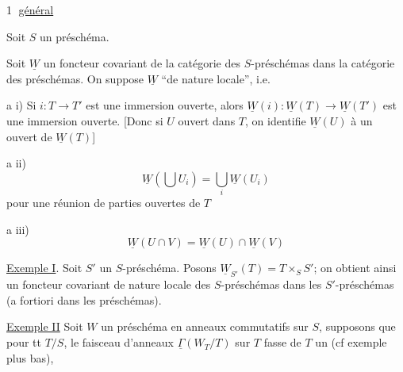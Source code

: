 \textcircled{1}
\uline{ général}

Soit $S$ un préschéma. 

Soit $\underline W$ un foncteur covariant de la catégorie des $S$-préschémas dans la catégorie des  préschémas. On suppose $\underline W$ ``de nature locale'', i.e.

a i) Si $i:T\to T'$ est une immersion ouverte, alors $\underline W(i):\underline W(T)\to\underline W(T')$ est une immersion ouverte.
[Donc si $U$ ouvert dans $T$, on identifie $\underline W(U)$ à un ouvert de $\underline W(T)$]


a ii)
\[
\underline W(\bigcup U_i)=\bigcup_i\underline W(U_i)
\]
pour une réunion  de parties ouvertes de $T$

a iii)
\[
\underline W(U\cap V)=\underline W(U)\cap\underline W(V)
\]

\uline{Exemple I}. Soit $S'$ un $S$-préschéma. Posons $\underline W_{S'}(T)=T\times_S S'$; on obtient ainsi  un foncteur covariant de nature locale des $S$-préschémas dans les $S'$-préschémas (a fortiori dans les préschémas).


\uline{Exemple II} Soit $W$ un  préschéma en anneaux commutatifs sur $S$, supposons que pour tt $T/S$, le faisceau d'anneaux $\underline\Gamma(W_T/T)$ sur $T$ fasse de $T$ un  (cf exemple plus bas), 
